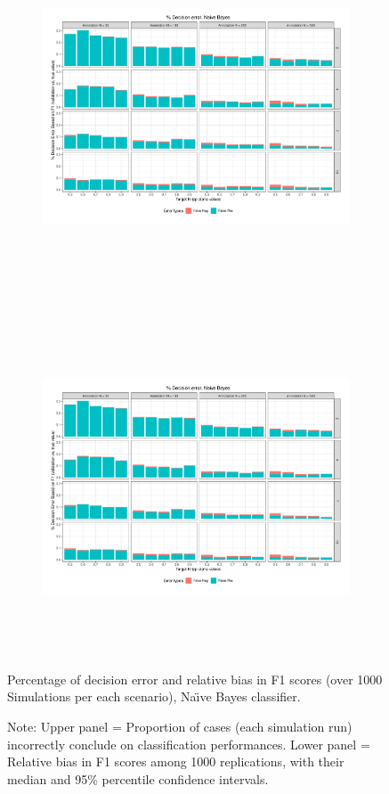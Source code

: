 \documentclass[man, floatsintext, 12pt, a4paper, noextraspace]{apa6}
\begin{document}
\begin{figure}[!htbp] 
    \centering
    \begin{subfigure}[t]{0.95\textwidth}
        \centering
        \includegraphics[clip, width=\columnwidth, height=11cm, page = 1]{Results/BAYES_summary_05.pdf} 
    \end{subfigure}
    \begin{subfigure}[t]{0.95\textwidth}
        \centering
        \captionsetup{font=small}
        \includegraphics[clip, width=\columnwidth, height=10cm, page = 2]{Results/BAYES_summary_05.pdf} 
    \end{subfigure}
    
    \captionsetup{format=hang}
    \caption{Percentage of decision error and relative bias in F1 scores (over 1000 Simulations per each scenario), Na\"{\i}ve Bayes classifier.} 
    \label{fig:Figure2}
    \captionsetup{font=small}
    \caption*{Note: Upper panel = Proportion of cases (each simulation run) incorrectly conclude on classification performances. Lower panel = Relative bias in F1 scores among 1000 replications, with their median and 95\% percentile confidence intervals.}
\end{figure}          
\end{document}

